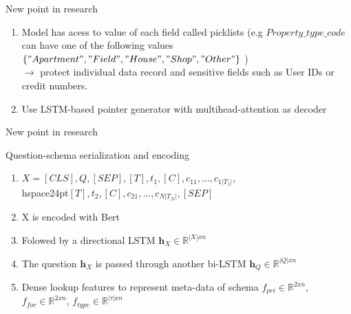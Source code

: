 \documentclass{beamer}
\begin{document}
\begin{frame}[t]{New point in research}\vspace{10pt}
\begin{enumerate}
\item  Model has acess to value of each field called picklists (e.g $Property\_type\_code$ can have one of the following values $\{"Apartment","Field","House","Shop","Other"\}$ ) \\
$\rightarrow$ protect individual data record and sensitive fields such as User IDs or credit numbers.
\item Use LSTM-based pointer generator with multihead-attention as decoder
\end{enumerate}
\end{frame} 
\begin{frame}[t]{New point in research}\vspace{10pt}
\begin{block}{Question-schema serialization and encoding}
\vspace{0.5em}
\begin{enumerate}
\item $X = [CLS],Q,[SEP],[T],t_{1},[C],c_{11},...,c_{1|T_1|},$ \\hspace{24pt}$[T],t_{2},[C],c_{21},...,c_{N|T_N|},[SEP]$ \\
\item X is encoded with Bert
\item Folowed by a directional LSTM $\textbf{h}_{X}\in\mathbb{R}^{|X|xn}$ 
\item The question $\textbf{h}_{X}$ is passed through another bi-LSTM $\textbf{h}_{Q}\in\mathbb{R}^{|Q|xn}$ 
\item Dense lookup features to represent meta-data of schema $f_{pri}\in\mathbb{R}^{2xn}$, $f_{for}\in\mathbb{R}^{2xn}$, $f_{type}\in\mathbb{R}^{|\tau|xn}$
\vspace{0.5em}
\end{enumerate}
\end{block}
\end{frame}
\end{document}
